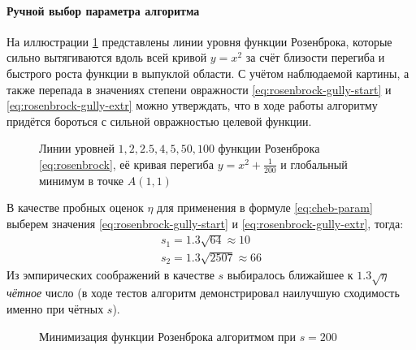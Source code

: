 \paragraph{Ручной выбор параметра алгоритма \relch{}}

На иллюстрации \ref{fig:rosenbrock-contours} представлены линии уровня
функции Розенброка, которые сильно вытягиваются вдоль всей кривой
$y=x^2$ за счёт близости перегиба и быстрого роста функции в выпуклой
области. С учётом наблюдаемой картины, а также перепада в значениях
степени овражности \eqref{eq:rosenbrock-gully-start} и
\eqref{eq:rosenbrock-gully-extr} можно утверждать, что в ходе работы
алгоритму придётся бороться с сильной овражностью целевой функции.

\begin{figure}[!thb]
  \centering
  \caption[Функция Розенброка]{Линии уровней $1, 2, 2.5, 4, 5, 50,
    100$ функции Розенброка \eqref{eq:rosenbrock}, её кривая перегиба
    $y=x^2+\frac{1}{200}$ и глобальный минимум в точке $A(1, 1)$}
  \label{fig:rosenbrock-contours}
\end{figure}

В качестве пробных оценок $\eta$ для применения в формуле
\eqref{eq:cheb-param} выберем значения
\eqref{eq:rosenbrock-gully-start} и \eqref{eq:rosenbrock-gully-extr}, тогда:
\begin{gather*}
  s_1 = 1.3 \sqrt{64} \approx 10 \\
  s_2 = 1.3 \sqrt{2507} \approx 66
\end{gather*}
Из эмпирических соображений в качестве $s$ выбиралось ближайшее к
$1.3\sqrt{\eta}$ \emph{чётное} число (в ходе тестов алгоритм
демонстрировал наилучшую сходимость именно при чётных $s$).

\begin{figure}[!thb]
  \centering
  \caption[\relch{} на функции Розенброка, $s=200$]{Минимизация
    функции Розенброка алгоритмом \relch{} при $s=200$}
\end{figure}
